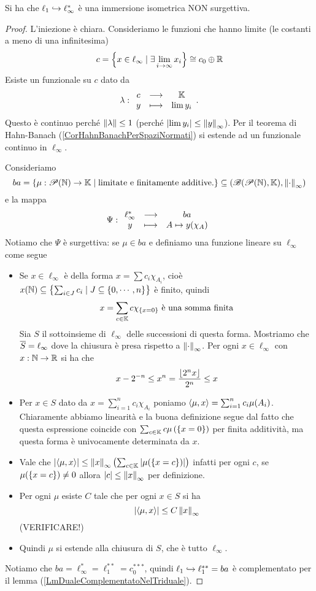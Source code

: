 \begin{proposition}\label{PrDualelinftyContienel1}
Si ha che $\ell_1\hookrightarrow \ell_\infty^\ast$ \`e una immersione isometrica NON surgettiva.
\end{proposition}
\begin{proof}
L'iniezione \`e chiara. Consideriamo le funzioni che hanno limite (le costanti a meno di una infinitesima)
\[c=\left\{{x\in\ell_\infty\mid \exists \lim_{i\to\infty}x_i}\right\}\cong c_0\oplus \mathbb{R}\]
Esiste un funzionale su $c$ dato da
\[\lambda:\begin{array}{ccc} {c} & \longrightarrow & {\mathbb{K}}\\ {y} & \longmapsto & {\lim y_i} \end{array}.\]
Questo \`e continuo perch\'e $\left\Vert{\lambda}\right\Vert\leq 1$ (perch\'e $\left|{\lim y_i}\right|\leq \left\Vert{y}\right\Vert_\infty$). Per il teorema di Hahn-Banach (\ref{CorHahnBanachPerSpaziNormati}) si estende ad un funzionale continuo in $\ell_\infty$.

Consideriamo
\[ba=\left\{{\mu:\mathscr{P}(\mathbb{N})\to\mathbb{K}\mid \text{limitate e finitamente additive.}}\right\}\subseteq (\mathscr{B}(\mathscr{P}(\mathbb{N}),\mathbb{K}),\left\Vert{\cdot}\right\Vert_\infty)\]
e la mappa
\[\Psi:\begin{array}{ccc} {\ell_\infty^\ast} & \longrightarrow & {ba}\\ {y} & \longmapsto & {A\mapsto y(\chi_A)} \end{array}\]
Notiamo che $\Psi$ \`e surgettiva: se $\mu\in ba$ e definiamo una funzione lineare su $\ell_\infty$ come segue
\begin{itemize}
    \item Se $x\in\ell_\infty$ \`e della forma $x=\sum c_i\chi_{A_i}$, cio\`e $x(\mathbb{N})\subseteq \left\{{\sum_{i\in J}c_i\mid J\subseteq \left\{{0,\cdots, n}\right\}}\right\}$ \`e finito, quindi
    \[x=\sum_{c\in\mathbb{K}}c\chi_{\left\{{x=0}\right\}}\text{ \`e una somma finita}\]
    Sia $S$ il sottoinsieme di $\ell_\infty$ delle successioni di questa forma.
    Mostriamo che $\overline{S}=\ell_\infty$ dove la chiusura \`e presa rispetto a $\left\Vert{\cdot}\right\Vert_\infty$. Per ogni $x\in \ell_\infty$ con $x:\mathbb{N}\to\mathbb{R}$ si ha che
    \[x-2^{-n}\leq x^n=\frac{\left\lfloor {2^n x}\right\rfloor}{2^n}\leq x\]
    \item Per $x\in S$ dato da $x=\sum_{i=1}^n c_i\chi_{A_i}$ poniamo $\left\langle {\mu,x}\right\rangle=\sum_{i=1}^n c_i\mu(A_i)$. Chiaramente abbiamo linearit\`a e la buona definizione segue dal fatto che questa espressione coincide con $\sum_{c\in\mathbb{K}}c\mu\left({\left\{{x=0}\right\}}\right)$ per finita additivit\`a, ma questa forma \`e univocamente determinata da $x$.
    \item Vale che $\left|{\left\langle {\mu,x}\right\rangle}\right|\leq \left\Vert{x}\right\Vert_\infty\left({\sum_{c\in \mathbb{K}} \left|{\mu(\left\{{x=c}\right\})}\right|}\right)$ infatti per ogni $c$, se $\mu(\left\{{x=c}\right\})\neq 0$ allora $\left|{c}\right|\leq \left\Vert{x}\right\Vert_\infty$ per definizione.
    \item Per ogni $\mu$ esiste $C$ tale che per ogni $x\in S$ si ha 
    \[\left|{\left\langle {\mu,x}\right\rangle}\right|\leq C\left\Vert{x}\right\Vert_\infty\]
    (VERIFICARE!)
    \item Quindi $\mu$ si estende alla chiusura di $S$, che \`e tutto $\ell_\infty$. 
\end{itemize}
Notiamo che $ba=\ell_\infty^\ast=\ell_1^{\ast\ast}=c_0^{\ast\ast\ast}$, quindi $\ell_1\hookrightarrow \ell_1^{\ast\ast}=ba$ \`e complementato per il lemma (\ref{LmDualeComplementatoNelTriduale}).
\end{proof}



